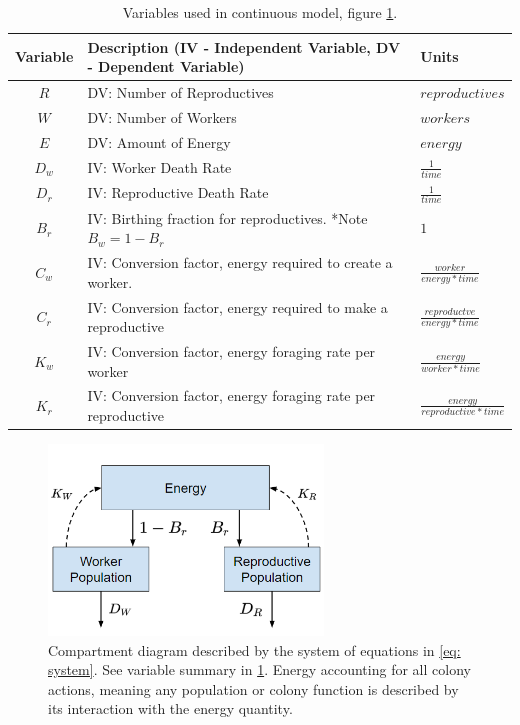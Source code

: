 \documentclass[12pt]{report}
\begin{document}
\begin{table}
\begin{tabular}{||c l l |}
\hline
 

 Variable & Description (IV - Independent Variable, DV - Dependent Variable) & Units  \\ [0.5ex] 
 \hline\hline
 $R$  & DV: Number of Reproductives 			& $reproductives$ \\  [5pt]
 $W$ & DV: Number of Workers    					& $workers$ \\ [5pt]
 $E$  & DV: Amount of Energy 							& $energy$ \\  [5pt]
 $D_w$& IV: Worker Death Rate 							& $\frac{1}{time}$  \\   [5pt]
 $D_r$ & IV: Reproductive Death Rate 				& $\frac{1}{time}$   \\  [5pt]
 $B_r$ & IV: Birthing fraction for reproductives.  *Note $B_w = 1-B_r$  & $1$  \\  [5pt]
 $C_w$& IV: Conversion factor, energy required to create a worker. & $\frac{worker}{energy * time}$ \\  [5pt]
 $C_r$ & IV: Conversion factor, energy required to make a reproductive & $\frac{reproductve}{energy * time}$ \\ 
 $K_w$& IV: Conversion factor, energy foraging rate per worker & $\frac{energy}{worker * time}$ \\  [5pt]
 $K_r$ & IV: Conversion factor, energy foraging rate per reproductive & $\frac{energy}{reproductive * time}$ \\  [5pt] \hline
\end{tabular}
\label{table: variables}
\caption{Variables used in continuous model, figure \ref{fig: Compartment Diagram}.}
\end{table}

\begin{figure}
	\centering
    \includegraphics[width=0.65\textwidth]{compartmentdiagram.png}
    \caption{Compartment diagram described by the system of equations in \ref{eq: system}.  See variable summary in \ref{table: variables}. Energy accounting for all colony actions, meaning any population or colony function is described by its interaction with the energy quantity. }
    \label{fig: Compartment Diagram}
\end{figure}
\end{document}
